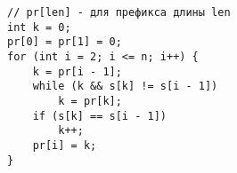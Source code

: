 \begin{verbatim}
// pr[len] - для префикса длины len
int k = 0;
pr[0] = pr[1] = 0;
for (int i = 2; i <= n; i++) {
	k = pr[i - 1];
	while (k && s[k] != s[i - 1])
		k = pr[k];
	if (s[k] == s[i - 1])
		k++;
	pr[i] = k;
}
\end{verbatim}
